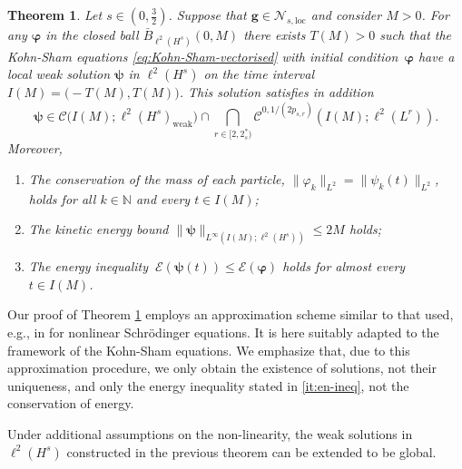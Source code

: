 \documentclass[12pt,a4paper]{amsart}
\newtheorem{theorem}{Theorem}[section]
\numberwithin{equation}{section}
\newcommand{\ulg}{\boldsymbol{g}}
\newcommand{\ulpsi}{\boldsymbol{\psi}}
\newcommand{\ulphi}{\boldsymbol{\varphi}}
\newcommand{\twoasts}{{2^*_s}}
\newcommand{\Nloc}{\mathscr{N}_{s,\mathrm{loc}}}
\begin{document}
	\begin{theorem}\label{thm:local_existence}
		Let $s\in(0,\frac32)$. Suppose that $\ulg\in\Nloc$ and consider $M>0$. For any $ \ulphi$  in the closed ball $\bar{B}_{\ell^2(H^{s})}(0,M)$ there exists $T(M) >0 $ such that the Kohn-Sham equations \eqref{eq:Kohn-Sham-vectorised} with initial condition~$ \ulphi  $ have a local weak solution $\ulpsi$ in $\ell^2(H^s)$ on the time interval $I(M)=\big(-T(M),T(M)\big)$. This solution satisfies in addition 
		\begin{equation}
			\ulpsi \in \mathscr{C}\big(I(M);\ell^2(H^{s})_{\mathrm{weak}}\big) \cap \bigcap_{r \in [2,\twoasts ) } \mathscr{C}^{0,1/(2p_{s,r})}(I(M);\ell^2(L^r)) .%
		\end{equation}
		Moreover,
		\begin{enumerate}[label=\roman*)]
			\item \label{it:cons-l2L2} The conservation of the mass of each particle, $\| \varphi_k \|_{L^2} = \| \psi_k(t) \|_{L^2} $, holds for all $k \in \mathbb{N}$ and every $ t \in I(M)$;
			\item \label{it:kin-bound} The kinetic energy bound $ \| \ulpsi \|_{L^{\infty}(I(M) ; \ell^2(H^{s}))}  \leq 2 M $ holds;
			\item \label{it:en-ineq} The energy inequality  $ \ \mathcal{E}(\ulpsi(t)) \leq \mathcal{E}(\ulphi ) $ holds for almost every  $t \in I(M)$.
		\end{enumerate}
	\end{theorem}
	
	Our proof of Theorem \ref{thm:local_existence} employs an approximation scheme similar to that used, e.g., in \cite[Theorem 3.3.5]{cazenave2003semilinear} for nonlinear Schrödinger equations. It is here suitably adapted to the framework of the Kohn-Sham equations. We emphasize that, due to this approximation procedure, we only obtain the existence of solutions, not their uniqueness, and only the energy inequality stated in \ref{it:en-ineq}, not the conservation of energy.
	
	Under additional assumptions on the non-linearity, the weak solutions in $\ell^2(H^s)$ constructed in the previous theorem can be extended to be global. 
	
\end{document}
